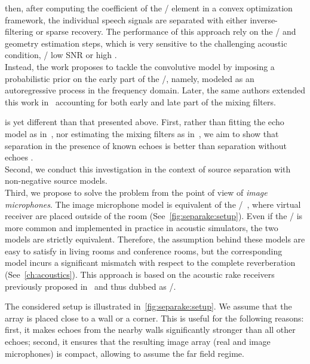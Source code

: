 then, after computing the coefficient of the \RIRs/ element in a convex optimization framework, the individual speech signals are separated with either inverse-filtering or sparse recovery.
The performance of this approach rely on the \RIR/ and geometry estimation steps, which is very sensitive to the challenging acoustic condition, \eg/ low SNR or high \RT.
\\Instead, the work  proposes to tackle the convolutive model by imposing a probabilistic prior on the early part of the \RIRs/, namely, modeled as an autoregressive process in the frequency domain.
Later, the same authors extended this work in~ accounting for both early and late part of the mixing filters.

 is yet different than that presented above.
First, rather than fitting the echo model as in~, nor estimating the mixing filters as in~,
we aim to show that separation in the presence of known echoes is better than separation without echoes .
\\Second, we conduct this investigation in the context of source separation with non-negative source models.
\\Third, we propose to solve the problem from the point of view of \textit{image microphones}.
The image microphone model is equivalent of the \ISMdef/~, where virtual receiver are placed outside of the room (See~\cref{fig:separake:setup}).
Even if the \ISM/ is more common and implemented in practice in acoustic simulators, the two models are strictly equivalent.
Therefore, the assumption behind these models are easy to satisfy in living rooms and conference rooms, but the corresponding model incurs a significant mismatch with respect to the complete reverberation (See~\cref{ch:acoustics}).
This approach is based on the acoustic rake receivers previously proposed in~ and thus dubbed as \SEPARAKEdef/.

\mynewline
The considered setup is illustrated in~\cref{fig:separake:setup}.
We assume that the array is placed close to a wall or a corner. This is useful for the following reasons:
first, it makes echoes from the nearby walls significantly stronger than all other echoes;
second, it ensures that the resulting image array (real and image microphones) is compact, allowing to assume the far field regime.

